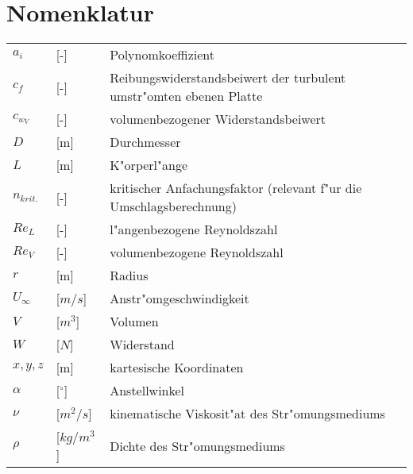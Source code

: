 \newpage
\chapter*{Nomenklatur}
\begin{tabular}{lll}
  \vspace{1mm}
  $a_i$            & [-]            & Polynomkoeffizient \\
  \vspace{1mm}
  $c_f$            & [-]            & Reibungswiderstandsbeiwert der
turbulent umstr"omten ebenen Platte \\
  \vspace{1mm}
  $c_{w_V}$        & [-]            & volumenbezogener
Widerstandsbeiwert \\
  \vspace{1mm}
  $D$              & [m]             & Durchmesser \\
  \vspace{1mm}
  $L$              & [m]            & K"orperl"ange \\
  \vspace{1mm}
  $n_{krit.}$      & [-]            & kritischer Anfachungsfaktor
(relevant f"ur die Umschlagsberechnung) \\
  \vspace{1mm}
  $Re_L$           & [-]            & l"angenbezogene Reynoldszahl \\
  \vspace{1mm}
  $Re_V$           & [-]            & volumenbezogene Reynoldszahl \\
  \vspace{1mm}
  $r$              & [m]            & Radius \\
  \vspace{1mm}
  $U_{\infty}$     & [$m/s$]        & Anstr"omgeschwindigkeit \\
  \vspace{1mm}
  $V$              & [$m^3$]        & Volumen \\     
   \vspace{1mm}
  $W$              & [$N$]          & Widerstand \\      
  \vspace{1mm}
  $x, y, z$        & [m]            & kartesische Koordinaten \\


  \vspace{1mm}
  $\alpha$        & [$^{\circ}$] & Anstellwinkel \\
  \vspace{1mm}
  $\nu$           & [$m^2/s$]    & kinematische Viskosit"at des
Str"omungsmediums \\
  \vspace{1mm}
  $\rho$          & [$kg/m^3$]   & Dichte des Str"omungsmediums \\
\end{tabular}
